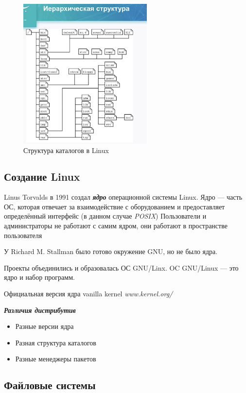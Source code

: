 \documentclass[oneside, final, 14pt]{extreport} %
\begin{document}
\begin{figure}[ht]
    \centering
    \includegraphics[width=0.6\textwidth]{4.png}
    \caption{Структура каталогов в Linux}
    \label{fig:4}
\end{figure}

\subsection{Создание Linux}
Linus Torvalds в 1991 создал \textit{\textbf{ядро}} операционной системы Linux.
Ядро --- часть ОС, которая отвечает за взаимодействие с оборудованием и предоставляет
определённый интерфейс (в данном случае \textit{POSIX})
Пользователи и администраторы не работают с самим ядром, они работают в пространстве пользователя

У Richard M. Stallman было готово окружение GNU, но не было ядра. 

Проекты объединились и образовалась ОС GNU/Linx. 
OC GNU/Linux --- это ядро и набор программ. 

Официальная версия ядра vanilla kernel \textit{www.kernel.org/}

\vspace{\baselineskip}
\textit{\textbf{Различия дистрибутив}}
\begin{itemize}
    \item Разные версии ядра
    \item Разная структура каталогов
    \item Разные менеджеры пакетов
\end{itemize}


\subsection{Файловые системы}
\end{document}
